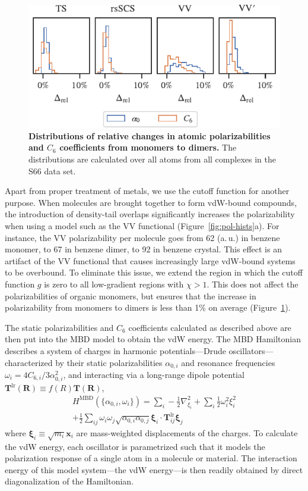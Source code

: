 \begin{figure}[t!]
\centering
\includegraphics{../media/pol-shifts.pdf}
\caption{\textbf{Distributions of relative changes in atomic polarizabilities and $C_6$ coefficients from monomers to dimers.}
The distributions are calculated over all atoms from all complexes in the S66 data set.
}\label{fig:pol-shifts}
\end{figure}

Apart from proper treatment of metals, we use the cutoff function for another purpose.
When molecules are brought together to form vdW-bound compounds, the introduction of density-tail overlaps significantly increases the polarizability when using a model such as the VV functional (Figure~\ref{fig:pol-hists}a).
For instance, the VV polarizability per molecule goes from 62 (a.\,u.) in benzene monomer, to 67 in benzene dimer, to 92 in benzene crystal.
This effect is an artifact of the VV functional that causes increasingly large vdW-bound systems to be overbound.
To eliminate this issue, we extend the region in which the cutoff function $g$ is zero to all low-gradient regions with $\chi>1$.
This does not affect the polarizabilities of organic monomers, but ensures that the increase in polarizability from monomers to dimers is less than 1\% on average (Figure~\ref{fig:pol-shifts}).


The static polarizabilities and $C_6$ coefficients calculated as described above are then put into the MBD model to obtain the vdW energy.
The MBD Hamiltonian describes a system of charges in harmonic potentials---Drude oscillators---characterized by their static polarizabilities $\alpha_{0,i}$ and resonance frequencies $\omega_i=4C_{6,i}/3\alpha_{0,i}^2$, and interacting via a long-range dipole potential $\mathbf T^\mathrm{lr}(\mathbf R)\equiv f(R)\mathbf T(\mathbf R)$,
\begin{multline}
  H^\text{MBD}(\{\alpha_{0,i},\omega_i\})=\sum_i-\frac12\nabla_{\xi_i}^2+\sum_i\frac12\omega_i^2\xi_i^2 \\
  +\frac12\sum_{ij}\omega_i\omega_j\sqrt{\alpha_{0,i}\alpha_{0,j}}\boldsymbol{\xi}_i\cdot\mathbf T^\mathrm{lr}_{ij}\boldsymbol{\xi}_j
\end{multline}
where $\boldsymbol\xi_i\equiv\sqrt{m_i}\mathbf x_i$ are mass-weighted displacements of the charges.
To calculate the vdW energy, each oscillator is parametrized such that it models the polarization response of a single atom in a molecule or material.
The interaction energy of this model system---the vdW energy---is then readily obtained by direct diagonalization of the Hamiltonian.

